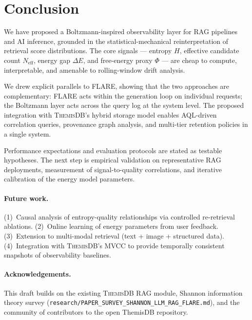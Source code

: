 \documentclass[11pt,a4paper]{article}
\newcommand{\themisdb}{\textsc{ThemisDB}}
\theoremstyle{definition}
\begin{document}
\section{Conclusion}
\label{sec:conclusion}

We have proposed a Boltzmann-inspired observability layer for RAG pipelines
and AI inference, grounded in the statistical-mechanical reinterpretation
of retrieval score distributions.
The core signals --- entropy $H$, effective candidate count $N_\text{eff}$,
energy gap $\Delta E$, and free-energy proxy $\Phi$ --- are cheap to
compute, interpretable, and amenable to rolling-window drift analysis.

We drew explicit parallels to FLARE, showing that the two approaches
are complementary: FLARE acts within the generation loop on individual
requests; the Boltzmann layer acts across the query log at the system
level.
The proposed integration with \themisdb{}'s hybrid storage model
enables AQL-driven correlation queries, provenance graph analysis,
and multi-tier retention policies in a single system.

Performance expectations and evaluation protocols are stated as
testable hypotheses.
The next step is empirical validation on representative RAG deployments,
measurement of signal-to-quality correlations, and iterative calibration
of the energy model parameters.

\paragraph{Future work.}
(1)~Causal analysis of entropy-quality relationships via controlled
re-retrieval ablations.
(2)~Online learning of energy parameters from user feedback.
(3)~Extension to multi-modal retrieval (text + image + structured data).
(4)~Integration with \themisdb{}'s MVCC to provide temporally
consistent snapshots of observability baselines.

\bigskip

\paragraph{Acknowledgements.}
This draft builds on the existing \themisdb{} RAG module, Shannon
information theory survey
(\texttt{research/PAPER\_SURVEY\_SHANNON\_LLM\_RAG\_FLARE.md}),
and the community of contributors to the open ThemisDB repository.



\end{document}
